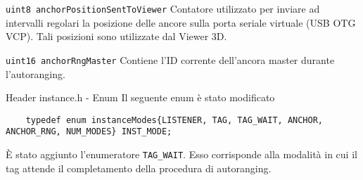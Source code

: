 \begin{frame}
  \begin{block}{\lstinline!uint8 anchorPositionSentToViewer!}
    Contatore utilizzato per inviare ad intervalli regolari la posizione delle ancore sulla porta seriale
    virtuale (USB OTG VCP). Tali posizioni sono utilizzate dal Viewer 3D.
  \end{block}
  \begin{block}{\lstinline!uint16 anchorRngMaster!}
    Contiene l'ID corrente dell'ancora master durante l'autoranging.
  \end{block}
\end{frame}

\begin{frame}[fragile]{Header instance.h - Enum}
  Il seguente enum è stato modificato
  \begin{lstlisting}
    typedef enum instanceModes{LISTENER, TAG, TAG_WAIT, ANCHOR, ANCHOR_RNG, NUM_MODES} INST_MODE;
  \end{lstlisting}
  È stato aggiunto l'enumeratore \lstinline!TAG_WAIT!. Esso corrisponde alla modalità in cui il tag
  attende il completamento della procedura di autoranging.
\end{frame}


